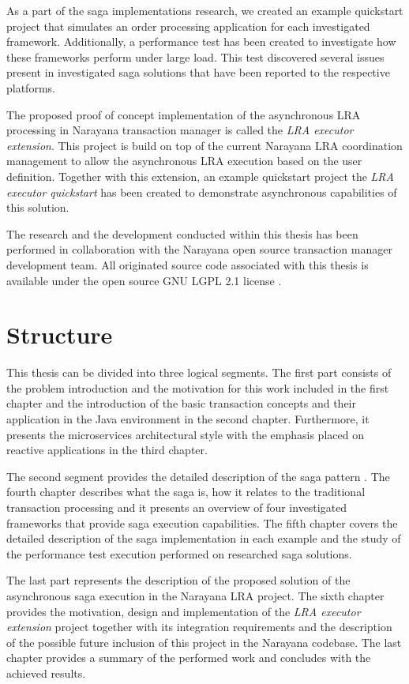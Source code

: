\documentclass[oneside,
  digital, %
  table,   %
  lof,     %
  lot,     %
]{fithesis3}
\begin{document}
As a part of the saga implementations research, we created an example quickstart project that simulates an order processing application for each investigated framework. Additionally, a performance test has been created to investigate how these frameworks perform under large load. This test discovered several issues present in investigated saga solutions that have been reported to the respective platforms.

The proposed proof of concept implementation of the asynchronous LRA processing in Narayana transaction manager is called the \textit{LRA executor extension}. This project is build on top of the current Narayana LRA coordination management to allow the asynchronous LRA execution based on the user definition. Together with this extension, an example quickstart project the \textit{LRA executor quickstart} has been created to demonstrate asynchronous capabilities of this solution.

The research and the development conducted within this thesis has been performed in collaboration with the Narayana open source transaction manager \cite{narayana} development team. All originated source code associated with this thesis is available under the open source GNU LGPL 2.1 license \cite{gnuLGPL21}.

\section{Structure}

This thesis can be divided into three logical segments. The first part consists of the problem introduction and the motivation for this work included in the first chapter and the introduction of the basic transaction concepts and their application in the Java environment in the second chapter. Furthermore, it presents the microservices architectural style with the emphasis placed on reactive applications in the third chapter.

The second segment provides the detailed description of the saga pattern \cite{sagas_publ}. The fourth chapter describes what the saga is, how it relates to the traditional transaction processing and it presents an overview of four investigated frameworks that provide saga execution capabilities. The fifth chapter covers the detailed description of the saga implementation in each example and the study of the performance test execution performed on researched saga solutions.

The last part represents the description of the proposed solution of the asynchronous saga execution in the Narayana LRA project. The sixth chapter provides the motivation, design and implementation of the \textit{LRA executor extension} project together with its integration requirements and the description of the possible future inclusion of this project in the Narayana codebase. The last chapter provides a summary of the performed work and concludes with the achieved results.
\end{document}
